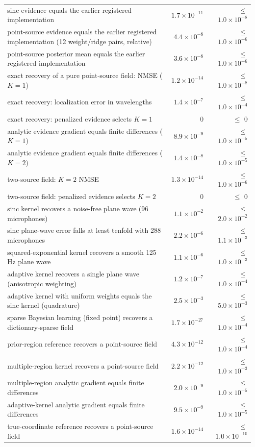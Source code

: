 \begin{longtable}{@{}p{13.2cm}rr@{}}
sinc evidence equals the earlier registered implementation & $1.7\times10^{-11}$ & $\le$ $1.0\times10^{-8}$\\
point-source evidence equals the earlier registered implementation (12 weight/ridge pairs, relative) & $4.4\times10^{-8}$ & $\le$ $1.0\times10^{-6}$\\
point-source posterior mean equals the earlier registered implementation & $3.6\times10^{-8}$ & $\le$ $1.0\times10^{-6}$\\
exact recovery of a pure point-source field: NMSE ($K=1$) & $1.2\times10^{-14}$ & $\le$ $1.0\times10^{-8}$\\
exact recovery: localization error in wavelengths & $1.4\times10^{-7}$ & $\le$ $1.0\times10^{-4}$\\
exact recovery: penalized evidence selects $K=1$ & 0 & $\le$ 0\\
analytic evidence gradient equals finite differences ($K=1$) & $8.9\times10^{-9}$ & $\le$ $1.0\times10^{-5}$\\
analytic evidence gradient equals finite differences ($K=2$) & $1.4\times10^{-8}$ & $\le$ $1.0\times10^{-5}$\\
two-source field: $K=2$ NMSE & $1.3\times10^{-14}$ & $\le$ $1.0\times10^{-6}$\\
two-source field: penalized evidence selects $K=2$ & 0 & $\le$ 0\\
sinc kernel recovers a noise-free plane wave (96 microphones) & $1.1\times10^{-2}$ & $\le$ $2.0\times10^{-2}$\\
sinc plane-wave error falls at least tenfold with 288 microphones & $2.2\times10^{-6}$ & $\le$ $1.1\times10^{-3}$\\
squared-exponential kernel recovers a smooth 125 Hz plane wave & $1.1\times10^{-6}$ & $\le$ $1.0\times10^{-3}$\\
adaptive kernel recovers a single plane wave (anisotropic weighting) & $1.2\times10^{-7}$ & $\le$ $1.0\times10^{-4}$\\
adaptive kernel with uniform weights equals the sinc kernel (quadrature) & $2.5\times10^{-3}$ & $\le$ $5.0\times10^{-3}$\\
sparse Bayesian learning (fixed point) recovers a dictionary-sparse field & $1.7\times10^{-27}$ & $\le$ $1.0\times10^{-4}$\\
prior-region reference recovers a point-source field & $4.3\times10^{-12}$ & $\le$ $1.0\times10^{-4}$\\
multiple-region kernel recovers a point-source field & $2.2\times10^{-12}$ & $\le$ $1.0\times10^{-3}$\\
multiple-region analytic gradient equals finite differences & $2.0\times10^{-9}$ & $\le$ $1.0\times10^{-5}$\\
adaptive-kernel analytic gradient equals finite differences & $9.5\times10^{-9}$ & $\le$ $1.0\times10^{-5}$\\
true-coordinate reference recovers a point-source field & $1.6\times10^{-14}$ & $\le$ $1.0\times10^{-10}$\\
\bottomrule
\end{longtable}
